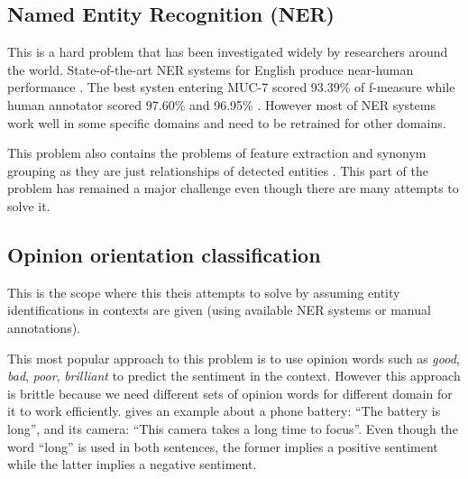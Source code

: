 \documentclass{article}
\begin{document}
\begin{multicols}{2}
  \subsection{Named Entity Recognition (NER)}
    This is a hard problem that has been investigated widely by researchers
around the world. State-of-the-art NER systems for English produce near-human
performance \citet{Wikipedia_NER}. The best systen entering MUC-7 scored 93.39\%
of f-measure while human annotator scored 97.60\% and 96.95\% \citet{Marsh1998}.
However most of NER systems work well in some specific domains and need to be
retrained for other domains.

    This problem also contains the problems of feature extraction and synonym
grouping as they are just relationships of detected entities
\cite{WebKnox2011}. This part of the problem has remained a major challenge
even though there are many attempts to solve it.


  \subsection{Opinion orientation classification}
    This is the scope where this theis attempts to solve by assuming 
entity identifications in contexts are given (using available NER systems or
manual annotations). 
    
    This most popular approach to this problem is to use opinion words
such as \textit{good}, \textit{bad}, \textit{poor}, \textit{brilliant} to
predict the sentiment in the context. However this approach is brittle because
we need different sets of opinion words for different domain for it to work
efficiently. \citet{Liu2010} gives an example about a phone battery: ``The
battery is long'', and its camera: ``This camera takes a long time to focus''.
Even though the word ``long'' is used in both sentences, the former implies a
positive sentiment while the latter implies a negative sentiment.


\end{multicols}
\end{document}
